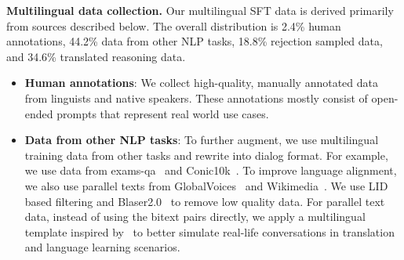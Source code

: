 \documentclass[dvipsnames]{fairmeta}
\begin{document}
\textbf{Multilingual data collection.} Our multilingual SFT data is derived primarily from sources described below. The overall distribution is 2.4\% human annotations, 44.2\% data from other NLP tasks, 18.8\% rejection sampled data, and 34.6\% translated reasoning data.
\begin{itemize}
        \item \textbf{Human annotations}: We collect high-quality, manually annotated data from linguists and native speakers. These annotations mostly consist of open-ended prompts that represent real world use cases. 

        \item \textbf{Data from other NLP tasks}: To further augment, we use multilingual training data from other tasks and rewrite into dialog format. For example, we use data from exams-qa~\citep{hardalov-etal-2020-exams} and Conic10k~\citep{wu2023conic10kchallengingmathproblem}. To improve language alignment, we also use parallel texts from GlobalVoices~\citep{PROKOPIDIS16.778} and Wikimedia~\citep{Tiedemann2012ParallelDT}. We use LID based filtering and Blaser2.0~\citep{seamlessm4t2023} to remove low quality data. For parallel text data, instead of using the bitext pairs directly, we apply a multilingual template inspired by~\citet{weifinetuned} to better simulate real-life conversations in translation and language learning scenarios.
     

\end{itemize}
\end{document}
